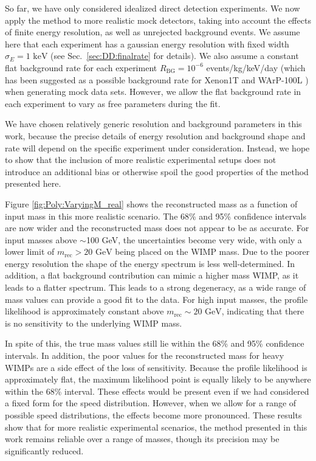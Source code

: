 So far, we have only considered idealized direct detection experiments. We now apply the method to more realistic mock detectors, taking into account the effects of finite energy resolution, as well as unrejected background events. We assume here that each experiment has a gaussian energy resolution with fixed width $\sigma_E = 1 \textrm{ keV}$ (see Sec.~\ref{sec:DD:finalrate} for details). We also assume a constant flat background rate for each experiment $R_\textrm{BG} = 10^{-6}$ events/kg/keV/day (which has been suggested as a possible background rate for Xenon1T \cite{Aprile:2010} and WArP-100L \cite{Grandi:2005}) when generating mock data sets. However, we allow the flat background rate in each experiment to vary as free parameters during the fit.

We have chosen relatively generic resolution and background parameters in this work, because the precise details of energy resolution and background shape and rate will depend on the specific experiment under consideration. Instead, we hope to show that the inclusion of more realistic experimental setups does not introduce an additional bias or otherwise spoil the good properties of the method presented here.

Figure \ref{fig:Poly:VaryingM_real} shows the reconstructed mass as a function of input mass in this more realistic scenario. The 68\% and 95\% confidence intervals are now wider and the reconstructed mass does not appear to be as accurate. For input masses above $\sim$100 GeV, the uncertainties become very wide, with only a lower limit of $m_\textrm{rec} > 20 \textrm{ GeV}$ being placed on the WIMP mass.  Due to the poorer energy resolution the shape of the energy spectrum is less well-determined. In addition, a flat background contribution can mimic a higher mass WIMP, as it leads to a flatter spectrum. This leads to a strong degeneracy, as a wide range of mass values can provide a good fit to the data. For high input masses, the profile likelihood is approximately constant above $m_\textrm{rec} \sim 20 \textrm{ GeV}$, indicating that there is no sensitivity to the underlying WIMP mass.

In spite of this, the true mass values still lie within the 68\% and 95\% confidence intervals. In addition, the poor values for the reconstructed mass for heavy WIMPs are a side effect of the loss of sensitivity. Because the profile likelihood is approximately flat, the maximum likelihood point is equally likely to be anywhere within the 68\% interval. These effects would be present even if we had considered a fixed form for the speed distribution. However, when we allow for a range of possible speed distributions, the effects become more pronounced. These results show that for more realistic experimental scenarios, the method presented in this work remains reliable over a range of masses, though its precision may be significantly reduced.

